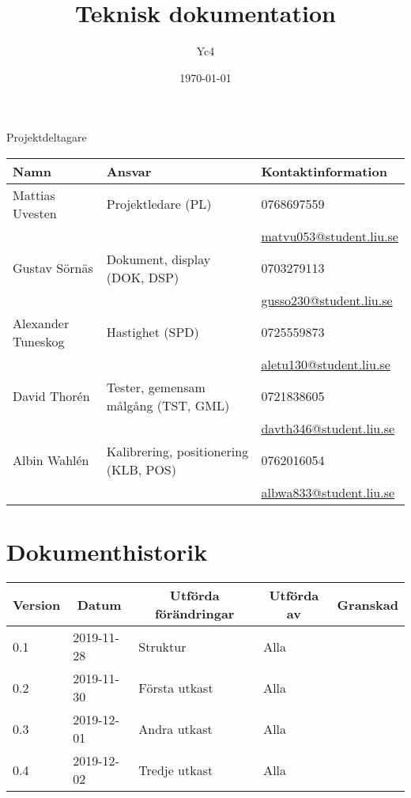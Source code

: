 \documentclass[10pt,oneside,swedish]{lips-no_customer}
\title{Teknisk dokumentation}
\author{Yc4}
\date{\today}
\begin{document}
\maketitle

\cleardoublepage
\makeprojectid

\begin{center}
  \Large Projektdeltagare
\end{center}
\begin{center}
  \begin{tabular}{|l|l|l|}
    \hline
			\textbf{Namn} & \textbf{Ansvar} & \textbf{Kontaktinformation}\\
		\hline
			Mattias Uvesten & Projektledare (PL) & 0768697559\\
			&& \url{matvu053@student.liu.se} \\
    \hline
			Gustav Sörnäs & Dokument, display (DOK, DSP) & 0703279113\\
			&& \url{gusso230@student.liu.se} \\
    \hline
			Alexander Tuneskog & Hastighet (SPD) & 0725559873 \\
			&& \url{aletu130@student.liu.se} \\
    \hline
			David Thorén & Tester, gemensam målgång (TST, GML) & 0721838605 \\
			&& \url{davth346@student.liu.se} \\
    \hline
			Albin Wahlén & Kalibrering, positionering (KLB, POS) & 0762016054 \\
			&& \url{albwa833@student.liu.se} \\
    \hline
  \end{tabular}
\end{center}

\section*{Dokumenthistorik}
\begin{tabular}{p{}|p{}|p{}|p{}|p{}} 
  \multicolumn{1}{c}{\bfseries Version} & 
  \multicolumn{1}{|c}{\bfseries Datum} & 
  \multicolumn{1}{|c}{\bfseries Utförda förändringar} & 
  \multicolumn{1}{|c}{\bfseries Utförda av} & 
  \multicolumn{1}{|c}{\bfseries Granskad}\\
  \hline
		0.1 & 2019-11-28 & Struktur & Alla \\
  \hline
		0.2 & 2019-11-30 & Första utkast & Alla & \\
  \hline
		0.3 & 2019-12-01 & Andra utkast & Alla & \\
  \hline
 		0.4 & 2019-12-02 & Tredje utkast & Alla & \\
  \hline
  
\end{tabular}
\end{document}
